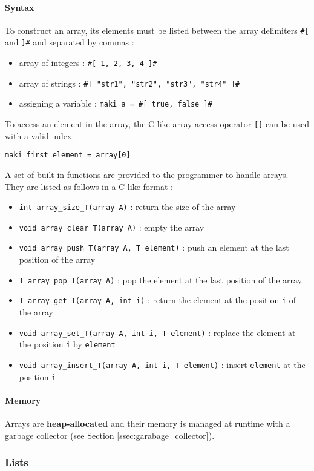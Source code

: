 \documentclass[a4paper,11pt]{article}
\begin{document}
\paragraph{Syntax}
To construct an array, its elements must be listed between the array delimiters \texttt{\#[} and \texttt{]\#} and separated by commas  :
\begin{itemize}
	\item array of integers : \texttt{\#[ 1, 2, 3, 4 ]\#}
	\item array of strings : \texttt{\#[ "str1", "str2", "str3", "str4" ]\#}
	\item assigning a variable : \texttt{maki a = \#[ true, false ]\#}
\end{itemize}
To access an element in the array, the C-like array-access operator \texttt{[]} can be used with a valid index.
\begin{center}
	\texttt{maki first\_element = array[0]}
\end{center}
A set of built-in functions are provided to the programmer to handle arrays. They are listed as follows in a C-like format :
\begin{itemize}
	\item \texttt{int array\_size\_T(array A)} : return the size of the array
	\item \texttt{void array\_clear\_T(array A)} : empty the array
	\item \texttt{void array\_push\_T(array A, T element)} : push an element at the last position of the array
	\item \texttt{T array\_pop\_T(array A)} : pop the element at the last position of the array
	\item \texttt{T array\_get\_T(array A, int i)} : return the element at the position \texttt{i} of the array
	\item \texttt{void array\_set\_T(array A, int i, T element)} : replace the element at the position \texttt{i} by \texttt{element}
	\item \texttt{void array\_insert\_T(array A, int i, T element)} : insert \texttt{element} at the position \texttt{i}
\end{itemize}
\paragraph{Memory} Arrays are \textbf{heap-allocated} and their memory is managed at runtime with a garbage collector (see Section \ref{ssec:garabage_collector}).

\subsubsection{Lists}
\label{sssec:lists}
\end{document}

